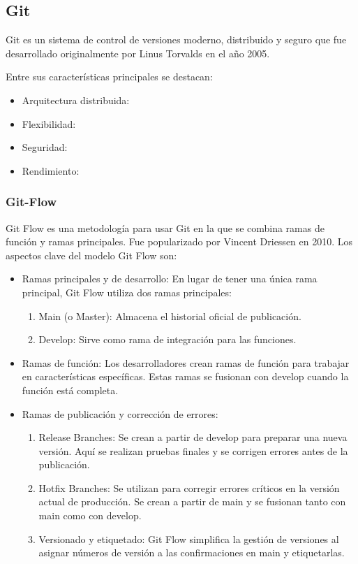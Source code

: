 \subsection{Git}
Git es un sistema de control de versiones moderno, distribuido y seguro que fue desarrollado originalmente por Linus Torvalds en el año 2005. 

Entre sus características principales se destacan:
\begin{itemize}
\item Arquitectura distribuida:
\item Flexibilidad:
\item Seguridad:
\item Rendimiento:
\end{itemize}

\subsubsection{Git-Flow}
Git Flow es una metodología para usar Git en la que se combina ramas de función y ramas principales. Fue popularizado por Vincent Driessen en 2010. Los aspectos clave del modelo Git Flow son:
\begin{itemize}
\item Ramas principales y de desarrollo: En lugar de tener una única rama principal, Git Flow utiliza dos ramas principales:
\begin{enumerate}
\item Main (o Master): Almacena el historial oficial de publicación.
\item Develop: Sirve como rama de integración para las funciones.
\end{enumerate}
\item Ramas de función: Los desarrolladores crean ramas de función para trabajar en características específicas. Estas ramas se fusionan con develop cuando la función está completa.
\item Ramas de publicación y corrección de errores:
\begin{enumerate}
\item Release Branches: Se crean a partir de develop para preparar una nueva versión. Aquí se realizan pruebas finales y se corrigen errores antes de la publicación.
\item Hotfix Branches: Se utilizan para corregir errores críticos en la versión actual de producción. Se crean a partir de main y se fusionan tanto con main como con develop.
\item Versionado y etiquetado: Git Flow simplifica la gestión de versiones al asignar números de versión a las confirmaciones en main y etiquetarlas.
\end{enumerate}
\end{itemize}

